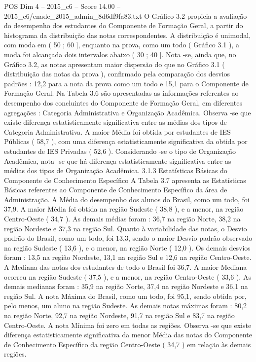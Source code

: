 \begin{textsample}{POS Dim 4 – 2015\_c6 – Score 14.00 – 2015\_c6/enade\_2015\_admin\_8d6df9fa83.txt}
O Gráfico 3.2 propicia a avaliação do desempenho dos estudantes do Componente de Formação Geral, a partir do histograma da distribuição das notas correspondentes.
A distribuição é unimodal, com moda em ( 50 ; 60 ], enquanto na prova, como um todo ( Gráfico 3.1 ), a moda foi alcançada dois intervalos abaixo ( 30 ; 40 ].
Nota -se, ainda que, no Gráfico 3.2, as notas apresentam maior dispersão do que no Gráfico 3.1 ( distribuição das notas da prova ), confirmado pela comparação dos desvios padrões : 12,2 para a nota da prova como um todo e 15,1 para o Componente de Formação Geral.
Na Tabela 3.6 são apresentadas as informações referentes ao desempenho dos concluintes do Componente de Formação Geral, em diferentes agregações : Categoria Administrativa e Organização Acadêmica.
Observa -se que existe diferença estatisticamente significativa entre as médias dos tipos de Categoria Administrativa.
A maior Média foi obtida por estudantes de IES Públicas ( 58,7 ), com uma diferença estatisticamente significativa da obtida por estudantes de IES Privadas ( 52,6 ).
Considerando -se o tipo de Organização Acadêmica, nota -se que há diferença estatisticamente significativa entre as médias dos tipos de Organização Acadêmica. 3.1.3 Estatísticas Básicas do Componente de Conhecimento Específico A Tabela 3.7 apresenta as Estatísticas Básicas referentes ao Componente de Conhecimento Específico da área de Administração.
A Média do desempenho dos alunos do Brasil, como um todo, foi 37,9.
A maior Média foi obtida na região Sudeste ( 38,8 ), e a menor, na região Centro-Oeste ( 34,7 ).
As demais médias foram : 36,7 na região Norte, 38,2 na região Nordeste e 37,3 na região Sul.
Quanto à variabilidade das notas, o Desvio padrão do Brasil, como um todo, foi 13,3, sendo o maior Desvio padrão observado na região Sudeste ( 13,6 ), e o menor, na região Norte ( 12,0 ).
Os demais desvios foram : 13,5 na região Nordeste, 13,1 na região Sul e 12,6 na região Centro-Oeste.
A Mediana das notas dos estudantes de todo o Brasil foi 36,7.
A maior Mediana ocorreu na região Sudeste ( 37,5 ), e a menor, na região Centro-Oeste ( 33,6 ).
As demais medianas foram : 35,9 na região Norte, 37,4 na região Nordeste e 36,1 na região Sul.
A nota Máxima do Brasil, como um todo, foi 95,1, sendo obtida por, pelo menos, um aluno na região Sudeste.
As demais notas máximas foram : 80,2 na região Norte, 92,7 na região Nordeste, 91,7 na região Sul e 83,7 na região Centro-Oeste.
A nota Mínima foi zero em todas as regiões.
Observa -se que existe diferença estatisticamente significativa da menor Média das notas do Componente de Conhecimento Específico da região Centro-Oeste ( 34,7 ) em relação às demais regiões.

\end{textsample}
